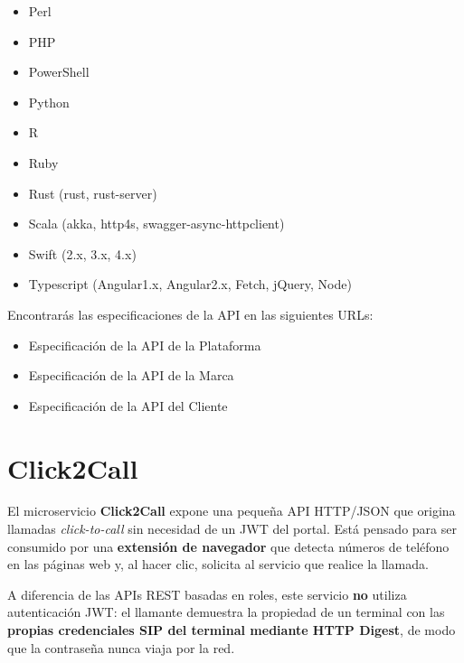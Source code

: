 \documentclass[letterpaper,10pt,spanish]{sphinxmanual}
\begin{document}
\begin{itemize}
\item {} 
Perl

\item {} 
PHP

\item {} 
PowerShell

\item {} 
Python

\item {} 
R

\item {} 
Ruby

\item {} 
Rust (rust, rust-server)

\item {} 
Scala (akka, http4s, swagger-async-httpclient)

\item {} 
Swift (2.x, 3.x, 4.x)

\item {} 
Typescript (Angular1.x, Angular2.x, Fetch, jQuery, Node)

\end{itemize}

Encontrarás las especificaciones de la API en las siguientes URLs:
\begin{itemize}
\item {} 
Especificación de la API de la Plataforma

\item {} 
Especificación de la API de la Marca

\item {} 
Especificación de la API del Cliente

\end{itemize}


\chapter{Click2Call}
\label{api_rest/click2call:click2call}\label{api_rest/click2call::doc}\label{api_rest/click2call:id1}
El microservicio \textbf{Click2Call} expone una pequeña API HTTP/JSON que origina llamadas \emph{click-to-call} sin necesidad de un JWT del portal. Está pensado para ser consumido por una \textbf{extensión de navegador} que detecta números de teléfono en las páginas web y, al hacer clic, solicita al servicio que realice la llamada.

A diferencia de las APIs REST basadas en roles, este servicio \textbf{no} utiliza autenticación JWT: el llamante demuestra la propiedad de un terminal con las \textbf{propias credenciales SIP del terminal mediante HTTP Digest}, de modo que la contraseña nunca viaja por la red.
\end{document}
